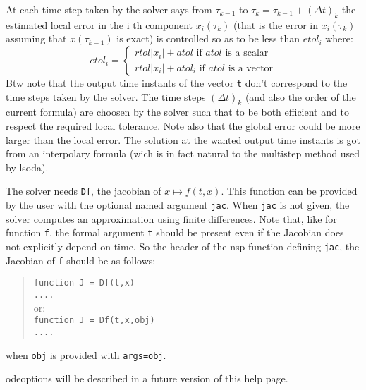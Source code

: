\begin{mandescription}
At each time step taken by the solver says from $\tau_{k-1}$ to  $\tau_k = \tau_{k-1} + (\Delta t)_k$
the estimated local error in the i th component $x_i(\tau_k)$ (that is the error in 
$x_i(\tau_k)$ assuming that $x(\tau_{k-1})$ is exact) is controlled so as to be less 
than $etol_i$ where:
$$
etol_i =
\left\{
\begin{array}{l}
 rtol | x_i | + atol  \mbox{ if } atol \mbox { is a scalar} \\
 rtol | x_i | + atol_i  \mbox{ if } atol \mbox { is a vector}
\end{array}
\right.
$$
 Btw note that the output time instants  of the vector \verb+t+ don't correspond 
to the time steps taken by the solver. The  time steps $(\Delta t)_k$
(and also the order of the current formula) are choosen by the solver such 
that to be both efficient and to respect the required local tolerance. Note 
also that the global error could be more larger than the local error. The 
solution at the wanted output time instants is got from an interpolary 
formula (wich is in fact natural to the multistep method used by lsoda).

 The solver needs \verb+Df+, the jacobian
of $x \mapsto f(t,x)$.  This function can be provided by the user
with the optional named argument \verb+jac+. When \verb+jac+ is not given,
the solver computes an approximation using finite differences. Note that, like
for function \verb+f+, the formal argument \verb+t+ should be present even if
the Jacobian does not explicitly depend on time. So the header of
the nsp function defining \verb+jac+, the Jacobian of \verb+f+ should be as follows:
\begin{quote}
{\tt function J = Df(t,x) \\
      ....}\\
or:\\
{\tt function J = Df(t,x,obj) \\
     ....}
\end{quote}
when {\tt obj} is provided with {\tt args=obj}.

odeoptions will be described in a future version of this help page.

\end{mandescription} 

